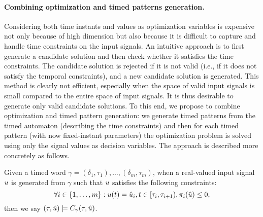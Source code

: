 \paragraph{Combining optimization and timed patterns generation.} Considering  both time instants and values as optimization variables is expensive not only because of high dimension but also because it is difficult to capture and handle time constraints on the input signals. An intuitive approach is to first generate a candidate solution and then check whether it satisfies the time constraints. The candidate solution is rejected if it is not valid (i.e., if it does not satisfy the temporal constraints), and a new candidate solution is generated. This method is clearly not efficient, especially when the space of valid input signals is small compared to the entire space of input signals. It is thus desirable to generate only valid candidate solutions. To this end, we propose to combine optimization and timed pattern generation: we generate timed patterns from the timed automaton (describing the time constraints) and then for each timed pattern (with now fixed-instant parameters) the optimization problem is solved using only the signal values as decision variables. The approach is described more concretely as follows.

Given a timed word $\gamma = (\delta_1, \tau_1), \ldots, (\delta_m, \tau_m)$, when a real-valued input signal $u$ is generated from $\gamma$ such that $u$ satisfies the following constraints:
$$\forall i \in \{1, \ldots, m \}: u (t)= \hat{u}_i, t \in [\tau_i, \tau_{i+1}), \pi_i(\hat{u})  \le 0,$$
then we say $(\tau, \hat{u}) \models C_{\gamma}(\tau, \hat{u})$.

